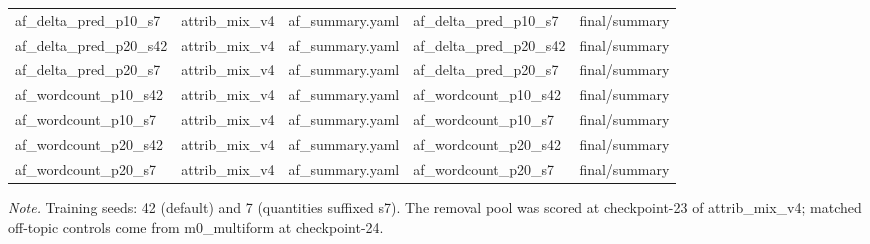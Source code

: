 \documentclass[10pt]{article}
\begin{document}
\begin{table}[tbp]
{\begin{tabular}{ lllll }
af\_delta\_pred\_p10\_s7 & attrib\_mix\_v4 & af\_summary.yaml & af\_delta\_pred\_p10\_s7 & final/summary \\

af\_delta\_pred\_p20\_s42 & attrib\_mix\_v4 & af\_summary.yaml & af\_delta\_pred\_p20\_s42 & final/summary \\

af\_delta\_pred\_p20\_s7 & attrib\_mix\_v4 & af\_summary.yaml & af\_delta\_pred\_p20\_s7 & final/summary \\

af\_wordcount\_p10\_s42 & attrib\_mix\_v4 & af\_summary.yaml & af\_wordcount\_p10\_s42 & final/summary \\

af\_wordcount\_p10\_s7 & attrib\_mix\_v4 & af\_summary.yaml & af\_wordcount\_p10\_s7 & final/summary \\

af\_wordcount\_p20\_s42 & attrib\_mix\_v4 & af\_summary.yaml & af\_wordcount\_p20\_s42 & final/summary \\

af\_wordcount\_p20\_s7 & attrib\_mix\_v4 & af\_summary.yaml & af\_wordcount\_p20\_s7 & final/summary \\

\bottomrule
\end{tabular}
}
\par\footnotesize\emph{Note.} Training seeds: 42 (default) and 7 (quantities suffixed s7). The removal pool was scored at checkpoint-23 of attrib\_mix\_v4; matched off-topic controls come from m0\_multiform at checkpoint-24.
\end{table}




\clearpage


\end{document}
